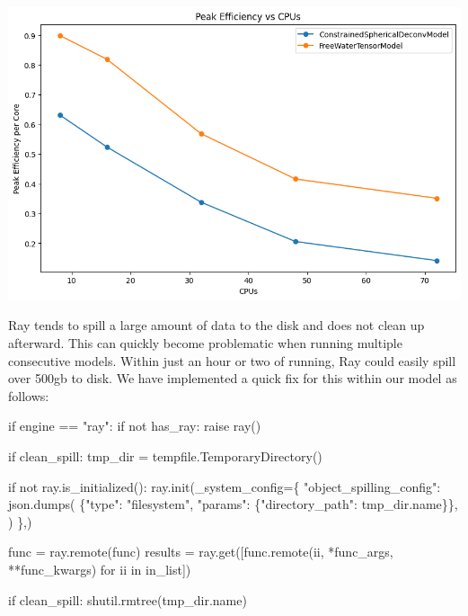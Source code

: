 \documentclass[
  letterpaper,
  DIV=11,
  numbers=noendperiod]{scrartcl}
\newenvironment{Shaded}{\begin{snugshade}}{\end{snugshade}}
\newcommand{\ControlFlowTok}[1]{\textcolor[rgb]{0.00,0.23,0.31}{#1}}
\newcommand{\KeywordTok}[1]{\textcolor[rgb]{0.00,0.23,0.31}{#1}}
\newcommand{\NormalTok}[1]{\textcolor[rgb]{0.00,0.23,0.31}{#1}}
\newcommand{\OperatorTok}[1]{\textcolor[rgb]{0.37,0.37,0.37}{#1}}
\newcommand{\StringTok}[1]{\textcolor[rgb]{0.13,0.47,0.30}{#1}}
\begin{document}
\includegraphics{figures/efficency_vs_cpus.png}

Ray tends to spill a large amount of data to the disk and does not clean
up afterward. This can quickly become problematic when running multiple
consecutive models. Within just an hour or two of running, Ray could
easily spill over 500gb to disk. We have implemented a quick fix for
this within our model as follows:

\begin{Shaded}
\begin{Highlighting}[]
    \ControlFlowTok{if}\NormalTok{ engine }\OperatorTok{==} \StringTok{"ray"}\NormalTok{:}
        \ControlFlowTok{if} \KeywordTok{not}\NormalTok{ has\_ray:}
            \ControlFlowTok{raise}\NormalTok{ ray()}

        \ControlFlowTok{if}\NormalTok{ clean\_spill:}
\NormalTok{            tmp\_dir }\OperatorTok{=}\NormalTok{ tempfile.TemporaryDirectory()}

            \ControlFlowTok{if} \KeywordTok{not}\NormalTok{ ray.is\_initialized():}
\NormalTok{                ray.init(\_system\_config}\OperatorTok{=}\NormalTok{\{}
                    \StringTok{"object\_spilling\_config"}\NormalTok{: json.dumps(}
\NormalTok{                        \{}\StringTok{"type"}\NormalTok{: }\StringTok{"filesystem"}\NormalTok{, }\StringTok{"params"}\NormalTok{: \{}\StringTok{"directory\_path"}\NormalTok{:}
\NormalTok{                         tmp\_dir.name\}\},}
\NormalTok{                    )}
\NormalTok{                \},)}

\NormalTok{        func }\OperatorTok{=}\NormalTok{ ray.remote(func)}
\NormalTok{        results }\OperatorTok{=}\NormalTok{ ray.get([func.remote(ii, }\OperatorTok{*}\NormalTok{func\_args, }\OperatorTok{**}\NormalTok{func\_kwargs)}
                          \ControlFlowTok{for}\NormalTok{ ii }\KeywordTok{in}\NormalTok{ in\_list])}

        \ControlFlowTok{if}\NormalTok{ clean\_spill:}
\NormalTok{            shutil.rmtree(tmp\_dir.name)}
\end{Highlighting}
\end{Shaded}
\end{document}
